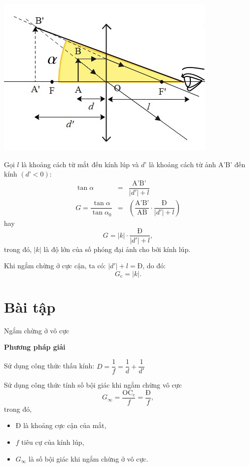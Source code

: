 \begin{center}
	\includegraphics[scale=0.8]{../figs/VN11-PH-41-L-029-2-h49.jpg}
\end{center}


Gọi $l$ là khoảng cách từ mắt đến kính lúp và $d’$ là khoảng cách từ ảnh A’B’ đến kính $(d’<0)$:
	\begin{eqnarray*}
			\tan \alpha &=&\dfrac{\text{A'B'}}{|d'|+l}\\
			G=\dfrac{\tan \alpha}{\tan \alpha_0}&=&\left(\dfrac{\text{A'B'}}{\text{AB}}\cdot \dfrac{\text{Đ}}{|d'|+l} \right)
	\end{eqnarray*}
hay 
\begin{equation}
G=|k|\cdot \dfrac{\text{Đ}}{|d'|+l},
\end{equation}
trong đó, $|k|$ là độ lớn của số phóng đại ảnh cho bởi kính lúp.

Khi ngắm chừng ở cực cận, ta có: $|d'|+l=\text{Đ}$, do đó:
\begin{equation}
G_\text{c}=|k|.
\end{equation}


\section{Bài tập }
\begin{dang}{Ngắm chừng ở vô cực}
\end{dang}
\textbf{Phương pháp giải}

Sử dụng công thức thấu kính: $D=\dfrac{1}{f}=\dfrac{1}{d}+\dfrac{1}{d'}$ 

Sử dụng công thức tính số bội giác khi ngắm chừng vô cực
\begin{equation}
G_\infty=\dfrac{\text{OC}_\text{c}}{f}=\dfrac{\text{Đ}}{f},
\end{equation}
trong đó,
\begin{itemize}
	\item $\text{Đ}$ là khoảng cực cận của mắt,
	\item $f$ tiêu cự của kính lúp,
	\item $G_\infty$ là số bội giác khi ngắm chừng ở vô cực. 
\end{itemize}

